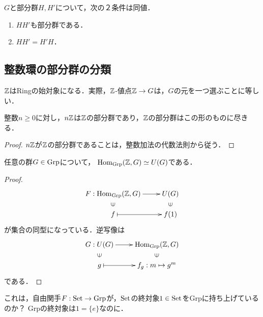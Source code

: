 \documentclass[uplatex,dvipdfmx]{jsreport}
\begin{document}
\begin{lemma}\label{lemma-5}
    $G$と部分群$H,H'$について，次の２条件は同値．
    \begin{enumerate}
        \item $HH'$も部分群である．
        \item $HH'=H'H$．
    \end{enumerate}
\end{lemma}

\subsection{整数環の部分群の分類}

\begin{tcolorbox}[colframe=ForestGreen, colback=ForestGreen!10!white,breakable,colbacktitle=ForestGreen!40!white,coltitle=black,fonttitle=\bfseries\sffamily,
title=]
    $\mathbb{Z}$はRingの始対象になる．実際，$\mathbb{Z}$-値点$\mathbb{Z}\to G$は，$G$の元を一つ選ぶことに等しい．
\end{tcolorbox}

\begin{proposition}\label{prop-Z-classification-of-subgroup}
    整数$n\ge 0$に対し，$n\mathbb{Z}$は$\mathbb{Z}$の部分群であり，$\mathbb{Z}$の部分群はこの形のものに尽きる．
\end{proposition}
\begin{proof}
    $n\mathbb{Z}$が$\mathbb{Z}$の部分群であることは，整数加法の代数法則から従う．

\end{proof}

\begin{proposition}\label{prop-characterization-of-additive-group-Z}
    任意の群$G\in\mathrm{Grp}$について，
    $\mathrm{Hom}_{\mathrm{Grp}}(\mathbb{Z},G)\simeq U(G)$である．
\end{proposition}
\begin{proof}
    \[\xymatrix@R-2pc{
        F:\Hom_\Grp(\Z,G)\ar[r]&U(G)\\
        \rotatebox[origin=c]{90}{$\in$}&\rotatebox[origin=c]{90}{$\in$}\\
        f\ar@{|->}[r]&f(1)
    }\]
    が集合の同型になっている．逆写像は
    \[\xymatrix@R-2pc{
        G:U(G)\ar[r]&\Hom_\Grp(\Z,G)\\
        \rotatebox[origin=c]{90}{$\in$}&\rotatebox[origin=c]{90}{$\in$}\\
        g\ar@{|->}[r]&f_g:m\mapsto g^m
    }\]
    である．
\end{proof}
\begin{remarks}
    これは，自由関手$F:\mathrm{Set}\to\mathrm{Grp}$が，$\mathrm{Set}$の終対象$1\in\mathrm{Set}$をGrpに持ち上げているのか？
    Grpの終対象は$1=\{e\}$なのに．
\end{remarks}
\end{document}
